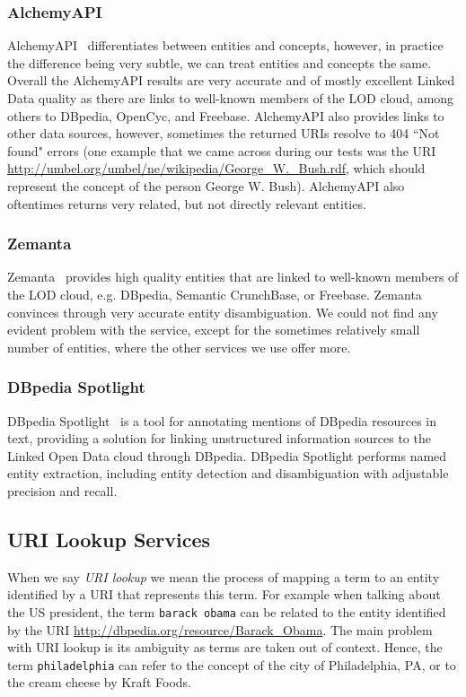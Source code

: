 \documentclass[12pt]{article}
\begin{document}
\subsubsection{AlchemyAPI}
AlchemyAPI~\cite{AlchemyAPI} differentiates between entities and concepts, however, in practice the difference being very subtle, we can treat entities and concepts the same. Overall the AlchemyAPI results are very accurate and of mostly excellent Linked Data quality as there are links to well-known members of the LOD cloud, among others to DBpedia, OpenCyc, and Freebase. AlchemyAPI also provides links to other data sources, however, sometimes the returned URIs resolve to 404 ``Not found" errors (one example that we came across during our tests was the URI \url{http://umbel.org/umbel/ne/wikipedia/George_W._Bush.rdf}, which should represent the concept of the person George W. Bush). AlchemyAPI also oftentimes returns very related, but not directly relevant entities.

\subsubsection{Zemanta}
Zemanta~\cite{Zemanta} provides high quality entities that are linked to well-known members of the LOD cloud, e.g. DBpedia, Semantic CrunchBase, or Freebase. Zemanta convinces through very accurate entity disambiguation. We could not find any evident problem with the service, except for the sometimes relatively small number of entities, where the other services we use offer more.

\subsubsection{DBpedia Spotlight}
DBpedia Spotlight~\cite{spotlight} is a tool for annotating mentions of DBpedia resources in text, providing a solution for linking unstructured information sources to the Linked Open Data cloud through DBpedia. DBpedia Spotlight performs named entity extraction, including entity detection and disambiguation with adjustable precision and recall.

\subsection{URI Lookup Services}\label{sec:uri-lookup-services}
When we say \textit{URI lookup} we mean the process of mapping a term to an entity identified by a URI that represents this term. For example when talking about the US president, the term \texttt{barack obama} can be related to the entity identified by the URI \url{http://dbpedia.org/resource/Barack_Obama}. The main problem
with URI lookup is its ambiguity as terms are taken out of context. Hence, the term \texttt{philadelphia} can
refer to the concept of the city of Philadelphia, PA, or to the cream cheese by Kraft Foods.
\end{document}
